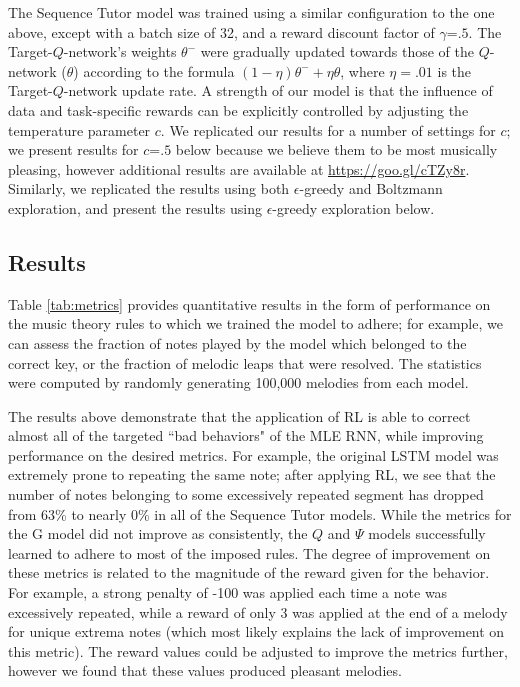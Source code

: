 The Sequence Tutor model was trained using a similar configuration to the one above, except with a batch size of 32, and a reward discount factor of $\gamma$=$.5$. The Target-$Q$-network's weights $\theta^-$ were gradually updated towards those of the $Q$-network ($\theta$) according to the formula $(1-\eta)\theta^- + \eta \theta$, where $\eta=.01$ is the Target-$Q$-network update rate. A strength of our model is that the influence of data and task-specific rewards can be explicitly controlled by adjusting the temperature parameter $c$. We replicated our results for a number of settings for $c$; we present results for $c$=$.5$ below because we believe them to be most musically pleasing, however additional results are available at \url{https://goo.gl/cTZy8r}. Similarly, we replicated the results using both $\epsilon$-greedy and Boltzmann exploration, and present the results using $\epsilon$-greedy exploration below.

\subsection{Results}

Table \ref{tab:metrics} provides quantitative results in the form of performance on the music theory rules to which we trained the model to adhere; for example, we can assess the fraction of notes played by the model which belonged to the correct key, or the fraction of melodic leaps that were resolved. The statistics were computed by randomly generating 100,000 melodies from each model.

The results above demonstrate that the application of RL is able to correct almost all of the targeted ``bad behaviors" of the MLE RNN, while improving performance on the desired metrics. For example, the original LSTM model was extremely prone to repeating the same note; after applying RL, we see that the number of notes belonging to some excessively repeated segment has dropped from 63\% to nearly 0\% in all of the Sequence Tutor models. While the metrics for the G model did not improve as consistently, the $Q$ and $\Psi$ models successfully learned to adhere to most of the imposed rules. The degree of improvement on these metrics is related to the magnitude of the reward given for the behavior. For example, a strong penalty of -100 was applied each time a note was excessively repeated, while a reward of only 3 was applied at the end of a melody for unique extrema notes (which most likely explains the lack of improvement on this metric). The reward values could be adjusted to improve the metrics further, however we found that these values produced pleasant melodies. 

